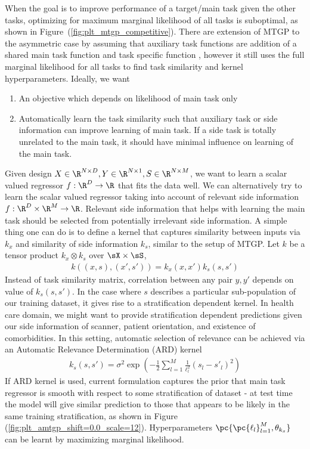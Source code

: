 \documentclass[11pt]{article}
\begin{document}
When the goal is to improve performance of a target/main task given the other tasks, optimizing for maximum marginal likelihood of all tasks is suboptimal, as shown in Figure~(\ref{fig:plt_mtgp_competitive}). There are extension of MTGP to the asymmetric case by assuming that auxiliary task functions are addition of a shared main task function and task specific function \cite{leenFocusedMultitaskLearning2012}, however it still uses the full marginal likelihood for all tasks to find task similarity and kernel hyperparameters. Ideally, we want
\begin{enumerate}
    \item An objective which depends on likelihood of main task only
    \item Automatically learn the task similarity such that auxiliary task or side information can improve learning of main task. If a side task is totally unrelated to the main task, it should have minimal influence on learning of the main task.
\end{enumerate}
Given design $X\in\R^{N\times D}, Y\in \R^{N\times 1}, S\in\R^{N\times M}$, we want to learn a scalar valued regressor $f:\R^D \to \R$ that fits the data well. We can alternatively try to learn the scalar valued regressor taking into account of relevant side information $f:\R^D\times \R^M \to\R$. Relevant side information that helps with learning the main task should be selected from potentially irrelevant side information. A simple thing one can do is to define a kernel that captures similarity between inputs via $k_x$ and similarity of side information $k_s$, similar to the setup of MTGP. Let $k$ be a tensor product $k_x\otimes k_s$ over $\sX\times \sS$, 
\begin{align}
    k((x,s),(x',s'))
        = k_x(x,x') k_s(s,s')
    \label{eq:amtgp_product_kernel}
\end{align}
Instead of task similarity matrix, correlation between any pair $y,y'$ depends on value of $k_s(s,s')$. In the case where $s$ describes a particular sub-population of our training dataset, it gives rise to a stratification dependent kernel. In health care domain, we might want to provide stratification dependent predictions given our side information of scanner, patient orientation, and existence of comorbidities. In this setting, automatic selection of relevance can be achieved via an Automatic Relevance Determination (ARD) kernel
\begin{align}
    k_s(s,s')
        = \sigma^2 \exp\left(
            -\frac{1}{2} \sum_{l=1}^M \frac{1}{\ell_l^2} (s_l - s'_l)^2 
        \right)
    \label{eq:amtgp_ard_kernel}
\end{align}
If ARD kernel is used, current formulation captures the prior that main task regressor is smooth with respect to some stratification of dataset - at test time the model will give similar prediction to those that appears to be likely in the same training stratification, as shown in Figure (\ref{fig:plt_amtgp_shift=0.0_scale=12}). Hyperparameters $\pc{\pc{\ell_l}_{l=1}^M, \theta_{k_x}}$ can be learnt by maximizing marginal likelihood. 
\end{document}
